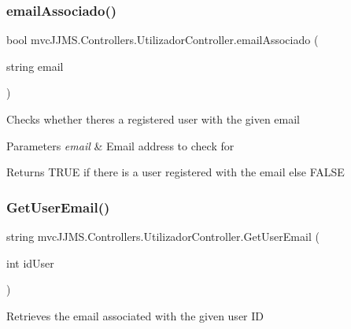\subsubsection{\texorpdfstring{email\+Associado()}{emailAssociado()}}
{\footnotesize\ttfamily bool mvc\+J\+J\+M\+S.\+Controllers.\+Utilizador\+Controller.\+email\+Associado (\begin{DoxyParamCaption}\item[{string}]{email }\end{DoxyParamCaption})\hspace{0.3cm}{\ttfamily [inline]}}



Checks whether there\textquotesingle{}s a registered user with the given email 


\begin{DoxyParams}{Parameters}
{\em email} & Email address to check for\\
\hline
\end{DoxyParams}
\begin{DoxyReturn}{Returns}
T\+R\+UE if there is a user registered with the email else F\+A\+L\+SE
\end{DoxyReturn}
\mbox{\label{classmvc_j_j_m_s_1_1_controllers_1_1_utilizador_controller_a11bcddd35c8eeaaea9a7baf761b8f877}} 
\subsubsection{\texorpdfstring{Get\+User\+Email()}{GetUserEmail()}}
{\footnotesize\ttfamily string mvc\+J\+J\+M\+S.\+Controllers.\+Utilizador\+Controller.\+Get\+User\+Email (\begin{DoxyParamCaption}\item[{int}]{id\+User }\end{DoxyParamCaption})\hspace{0.3cm}{\ttfamily [inline]}}



Retrieves the email associated with the given user ID 


